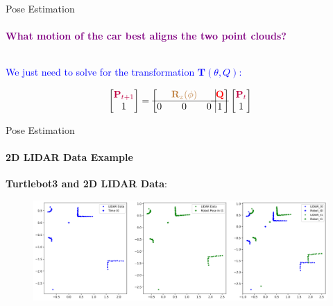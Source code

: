 \documentclass[aspectratio=169]{beamer}
\begin{document}
\begin{frame}{Pose Estimation}
	\framesubtitle{\textcolor{purple}{What motion of the car best aligns the two point clouds?}}
		
    \begin{columns}
        \begin{column}[c]{0.5\textwidth}
            
        \end{column}
        \begin{column}[c]{0.5\textwidth}
			\vspace{0.4in}
            
        \end{column}
    \end{columns}

	\vspace{0.1in}

	\begin{block}{\textcolor{blue}{We just need to solve for the transformation $\mathbf{T}(\theta, Q)$:}}

	\begin{equation*}
        \begin{bmatrix}
            \color{purple}{ \mathbf{P}_{t+1}} \\ 1
        \end{bmatrix}
        =
        \left[
            \begin{matrix}
                  & \color{brown}{\mathbf{R}_z(\phi)} &   \\ \hline
                0 & 0 & 0 \\
            \end{matrix} \right.
            \left.
            \vline
            \begin{matrix}
                \color{red}{\mathbf{Q}} \\ \hline
                1
            \end{matrix} \right]
        \begin{bmatrix}
            \color{purple}{\mathbf{P}_{t}} \\
            1
        \end{bmatrix}
    \end{equation*}
\end{block}
\end{frame}

\begin{frame}{Pose Estimation}
	\framesubtitle{2D LIDAR Data Example}

	\textbf{Turtlebot3 and 2D LIDAR Data}:

	\begin{figure}
		\includegraphics[width=1\textwidth]{./images/lidarExample.png}
	\end{figure}
\end{frame}
\end{document}
